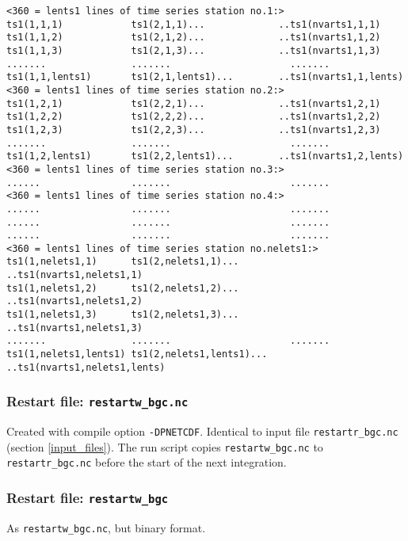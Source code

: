 \documentclass[11pt,a4paper,fleqn,twoside]{article}
\begin{document}
\begin{footnotesize}
\begin{verbatim}
<360 = lents1 lines of time series station no.1:>
ts1(1,1,1)            ts1(2,1,1)...             ..ts1(nvarts1,1,1)
ts1(1,1,2)            ts1(2,1,2)...             ..ts1(nvarts1,1,2)
ts1(1,1,3)            ts1(2,1,3)...             ..ts1(nvarts1,1,3)
.......               .......                     .......
ts1(1,1,lents1)       ts1(2,1,lents1)...        ..ts1(nvarts1,1,lents)
<360 = lents1 lines of time series station no.2:>
ts1(1,2,1)            ts1(2,2,1)...             ..ts1(nvarts1,2,1)
ts1(1,2,2)            ts1(2,2,2)...             ..ts1(nvarts1,2,2)
ts1(1,2,3)            ts1(2,2,3)...             ..ts1(nvarts1,2,3)
.......               .......                     .......
ts1(1,2,lents1)       ts1(2,2,lents1)...        ..ts1(nvarts1,2,lents)
<360 = lents1 lines of time series station no.3:>
......                .......                     .......
<360 = lents1 lines of time series station no.4:>
......                .......                     .......
......                .......                     .......
......                .......                     .......
<360 = lents1 lines of time series station no.nelets1:>
ts1(1,nelets1,1)      ts1(2,nelets1,1)...       ..ts1(nvarts1,nelets1,1) 
ts1(1,nelets1,2)      ts1(2,nelets1,2)...       ..ts1(nvarts1,nelets1,2) 
ts1(1,nelets1,3)      ts1(2,nelets1,3)...       ..ts1(nvarts1,nelets1,3) 
.......               .......                     .......
ts1(1,nelets1,lents1) ts1(2,nelets1,lents1)...  ..ts1(nvarts1,nelets1,lents) 
\end{verbatim}
\end{footnotesize}

\subsubsection{Restart file: {\tt restartw\_bgc.nc}} Created with compile
option {\tt -DPNETCDF}. Identical to input file {\tt restartr\_bgc.nc}
(section \ref{input_files}). The run
script copies {\tt restartw\_bgc.nc} to  {\tt restartr\_bgc.nc} before the
start of the next integration.

\subsubsection{Restart file: {\tt restartw\_bgc}} As {\tt restartw\_bgc.nc},
but binary format.
\end{document}
